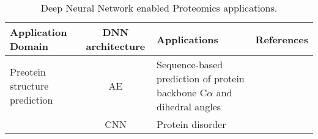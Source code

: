 \begin{table}[h!]
\centering
\begin{tabular}{|| l | c | l | l ||}
    \hline
    Application Domain & DNN architecture & Applications & References\\
    \hline \hline
    Preotein structure prediction & AE & Sequence-based prediction of protein backbone C$\alpha$ and dihedral angles & \\
    & CNN & Protein disorder \\
    \hline
\end{tabular}
\caption{Deep Neural Network enabled Proteomics applications.}
\label{tab:PS-DNN}
\end{table}